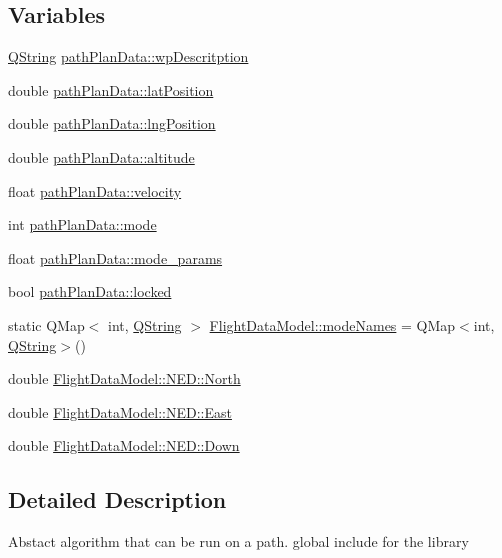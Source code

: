 \subsection*{\-Variables}
\begin{DoxyCompactItemize}
\item 
\hyperlink{group___u_a_v_objects_plugin_gab9d252f49c333c94a72f97ce3105a32d}{\-Q\-String} \hyperlink{group___path_gac7fc0b526eac540aa404e9d3d6ee95ef}{path\-Plan\-Data\-::wp\-Descritption}
\item 
double \hyperlink{group___path_ga741da9e938717a4dba1a1b28afc94d07}{path\-Plan\-Data\-::lat\-Position}
\item 
double \hyperlink{group___path_ga28464ee2b2537b0bc670193bc29627b7}{path\-Plan\-Data\-::lng\-Position}
\item 
double \hyperlink{group___path_ga6684fc7c8c169232f70b43e4fedc6eb0}{path\-Plan\-Data\-::altitude}
\item 
float \hyperlink{group___path_ga58910b1bf08e8e02291db4ea420cc383}{path\-Plan\-Data\-::velocity}
\item 
int \hyperlink{group___path_gabea436564f0d9df2abf6b4c35d505753}{path\-Plan\-Data\-::mode}
\item 
float \hyperlink{group___path_gaba12f55aa813b5f1dc707e3c1814ab14}{path\-Plan\-Data\-::mode\-\_\-params}
\item 
bool \hyperlink{group___path_ga5e07c3e8bda93b1d5dba9dd3d35c0280}{path\-Plan\-Data\-::locked}
\item 
static \-Q\-Map$<$ int, \hyperlink{group___u_a_v_objects_plugin_gab9d252f49c333c94a72f97ce3105a32d}{\-Q\-String} $>$ \hyperlink{group___path_gae4137f8c1c8d4c53cea911761c13b182}{\-Flight\-Data\-Model\-::mode\-Names} = \-Q\-Map$<$int, \hyperlink{group___u_a_v_objects_plugin_gab9d252f49c333c94a72f97ce3105a32d}{\-Q\-String}$>$()
\item 
double \hyperlink{group___path_ga67abe9626bfdec594f13dadb6a8e0507}{\-Flight\-Data\-Model\-::\-N\-E\-D\-::\-North}
\item 
double \hyperlink{group___path_ga61ad0d9a38807fe21d456dc84cdb80d7}{\-Flight\-Data\-Model\-::\-N\-E\-D\-::\-East}
\item 
double \hyperlink{group___path_gae7f07300d5df11f628d4be7fefddce05}{\-Flight\-Data\-Model\-::\-N\-E\-D\-::\-Down}
\end{DoxyCompactItemize}


\subsection{\-Detailed \-Description}
\-Abstact algorithm that can be run on a path. global include for the library

